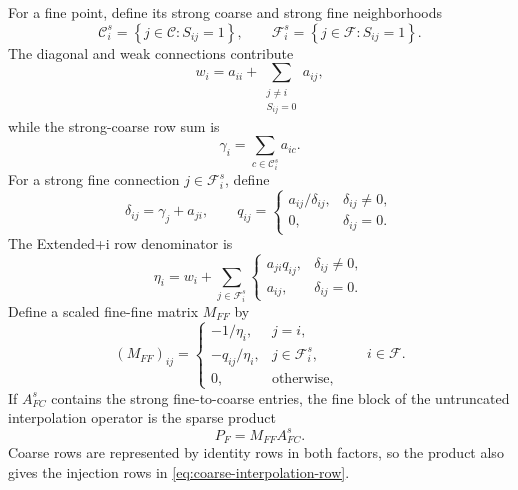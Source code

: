 \documentclass[11pt]{article}
\newcommand{\set}[1]{\left\{ #1 \right\}}
\begin{document}
For a fine point, define its strong coarse and strong fine neighborhoods
\begin{equation}
  \mathcal C_i^s
  =
  \set{j\in\mathcal C:S_{ij}=1},
  \qquad
  \mathcal F_i^s
  =
  \set{j\in\mathcal F:S_{ij}=1}.
  \label{eq:strong-coarse-neighborhood}
\end{equation}
The diagonal and weak connections contribute
\begin{equation}
  w_i
  =
  a_{ii}
  +
  \sum_{\substack{j\neq i\\S_{ij}=0}}a_{ij},
  \label{eq:weak-diagonal-sum}
\end{equation}
while the strong-coarse row sum is
\begin{equation}
  \gamma_i
  =
  \sum_{c\in\mathcal C_i^s}a_{ic}.
  \label{eq:strong-coarse-sum}
\end{equation}
For a strong fine connection $j\in\mathcal F_i^s$, define
\begin{equation}
  \delta_{ij}=\gamma_j+a_{ji},
  \qquad
  q_{ij}
  =
  \begin{cases}
    a_{ij}/\delta_{ij}, & \delta_{ij}\neq0,\\
    0,                  & \delta_{ij}=0.
  \end{cases}
  \label{eq:extended-i-fine-scale}
\end{equation}
The Extended+i row denominator is
\begin{equation}
  \eta_i
  =
  w_i
  +
  \sum_{j\in\mathcal F_i^s}
  \begin{cases}
    a_{ji}q_{ij}, & \delta_{ij}\neq0,\\
    a_{ij},       & \delta_{ij}=0.
  \end{cases}
  \label{eq:extended-i-row-denominator}
\end{equation}
Define a scaled fine-fine matrix $M_{FF}$ by
\begin{equation}
  (M_{FF})_{ij}
  =
  \begin{cases}
    -1/\eta_i,      & j=i,\\
    -q_{ij}/\eta_i, & j\in\mathcal F_i^s,\\
    0,              & \text{otherwise},
  \end{cases}
  \qquad i\in\mathcal F.
  \label{eq:scaled-ff}
\end{equation}
If $A_{FC}^s$ contains the strong fine-to-coarse entries, the fine block of
the untruncated interpolation operator is the sparse product
\begin{equation}
  P_F=M_{FF}A_{FC}^s.
  \label{eq:extended-i-product}
\end{equation}
Coarse rows are represented by identity rows in both factors, so the product
also gives the injection rows in \eqref{eq:coarse-interpolation-row}.
\end{document}
